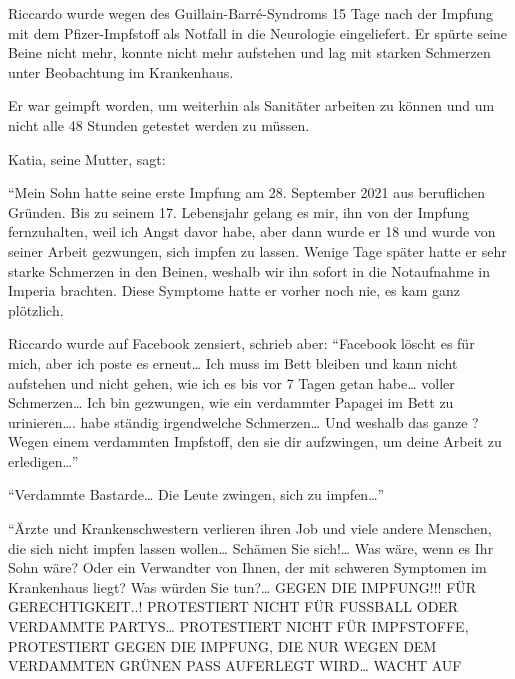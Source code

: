 Riccardo wurde wegen des Guillain-Barré-Syndroms 15 Tage nach der Impfung mit
dem Pfizer-Impfstoff als Notfall in die Neurologie eingeliefert. Er spürte seine
Beine nicht mehr, konnte nicht mehr aufstehen und lag mit starken Schmerzen
unter Beobachtung im Krankenhaus.

Er war geimpft worden, um weiterhin als Sanitäter arbeiten zu können und um
nicht alle 48 Stunden getestet werden zu müssen.

Katia, seine Mutter, sagt:

“Mein Sohn hatte seine erste Impfung am 28. September 2021 aus beruflichen
Gründen. Bis zu seinem 17. Lebensjahr gelang es mir, ihn von der Impfung
fernzuhalten, weil ich Angst davor habe, aber dann wurde er 18 und wurde von
seiner Arbeit gezwungen, sich impfen zu lassen. Wenige Tage später hatte er sehr
starke Schmerzen in den Beinen, weshalb wir ihn sofort in die Notaufnahme in
Imperia brachten. Diese Symptome hatte er vorher noch nie, es kam ganz
plötzlich.

Riccardo wurde auf Facebook zensiert, schrieb aber: “Facebook löscht es für
mich, aber ich poste es erneut… Ich muss im Bett bleiben und kann nicht
aufstehen und nicht gehen, wie ich es bis vor 7 Tagen getan habe… voller
Schmerzen… Ich bin gezwungen, wie ein verdammter Papagei im Bett zu
urinieren…. habe ständig irgendwelche Schmerzen… Und weshalb das ganze ? Wegen
einem verdammten Impfstoff, den sie dir aufzwingen, um deine Arbeit zu
erledigen…”

“Verdammte Bastarde… Die Leute zwingen, sich zu impfen…”

“Ärzte und Krankenschwestern verlieren ihren Job und viele andere Menschen, die
sich nicht impfen lassen wollen… Schämen Sie sich!… Was wäre, wenn es Ihr Sohn
wäre? Oder ein Verwandter von Ihnen, der mit schweren Symptomen im Krankenhaus
liegt? Was würden Sie tun?… GEGEN DIE IMPFUNG!!! FÜR GERECHTIGKEIT..!
PROTESTIERT NICHT FÜR FUSSBALL ODER VERDAMMTE PARTYS… PROTESTIERT NICHT FÜR
IMPFSTOFFE, PROTESTIERT GEGEN DIE IMPFUNG, DIE NUR WEGEN DEM VERDAMMTEN GRÜNEN
PASS AUFERLEGT WIRD… WACHT AUF
